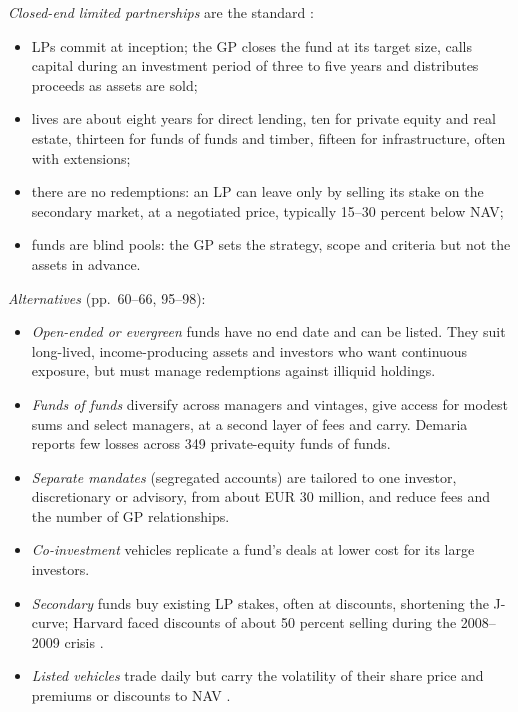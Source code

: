 \begin{qfmethod}\label{meth:private-fund-structures}
 \emph{Closed-end limited partnerships} are the standard \citep[pp.~61--63]{demaria-private-markets-2021}:
\begin{itemize}
\item LPs commit at inception; the GP closes the fund at its target size, calls capital during an investment period of three to five years and distributes proceeds as assets are sold;
\item lives are about eight years for direct lending, ten for private equity and real estate, thirteen for funds of funds and timber, fifteen for infrastructure, often with extensions;
\item there are no redemptions: an LP can leave only by selling its stake on the secondary market, at a negotiated price, typically 15--30 percent below NAV;
\item funds are blind pools: the GP sets the strategy, scope and criteria but not the assets in advance.
\end{itemize}
\emph{Alternatives} (pp.~60--66, 95--98):
\begin{itemize}
\item \emph{Open-ended or evergreen} funds have no end date and can be listed. They suit long-lived, income-producing assets and investors who want continuous exposure, but must manage redemptions against illiquid holdings.
\item \emph{Funds of funds} diversify across managers and vintages, give access for modest sums and select managers, at a second layer of fees and carry. Demaria reports few losses across 349 private-equity funds of funds.
\item \emph{Separate mandates} (segregated accounts) are tailored to one investor, discretionary or advisory, from about EUR 30 million, and reduce fees and the number of GP relationships.
\item \emph{Co-investment} vehicles replicate a fund's deals at lower cost for its large investors.
\item \emph{Secondary} funds buy existing LP stakes, often at discounts, shortening the J-curve; Harvard faced discounts of about 50 percent selling during the 2008--2009 crisis \citep[p.~595]{s7-ang}.
\item \emph{Listed vehicles} trade daily but carry the volatility of their share price and premiums or discounts to NAV \citep[p.~596]{s7-ang}.
\end{itemize}


\end{qfmethod}
